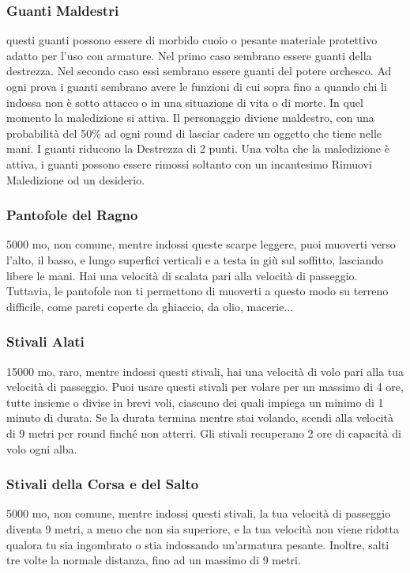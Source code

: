 \begin{multicols}{2}
\subsubsection*{Guanti Maldestri}
questi guanti possono essere di morbido cuoio o pesante materiale protettivo adatto per l’uso con armature. Nel primo caso sembrano essere guanti della destrezza. Nel secondo caso essi sembrano essere guanti del potere orchesco. Ad ogni prova i guanti sembrano avere le funzioni di cui sopra fino a quando chi li indossa non è sotto attacco o in una situazione di vita o di morte. In quel momento la maledizione si attiva. Il personaggio diviene maldestro, con una probabilità del 50\% ad ogni round di lasciar cadere un oggetto che tiene nelle mani. I guanti riducono la Destrezza di 2 punti. Una volta che la maledizione è attiva, i guanti possono essere rimossi soltanto con un incantesimo Rimuovi Maledizione od un desiderio.

\subsubsection*{Pantofole del Ragno}
5000 mo, non comune, mentre indossi queste scarpe leggere, puoi muoverti verso l'alto, il basso, e lungo superfici verticali e a testa in giù sul soffitto, lasciando libere le mani. Hai una velocità di scalata pari alla velocità di passeggio. Tuttavia, le pantofole non ti permettono di muoverti a questo modo su terreno difficile, come pareti coperte da ghiaccio, da olio, macerie...

\subsubsection*{Stivali Alati}
15000 mo, raro, mentre indossi questi stivali, hai una velocità di volo pari alla tua velocità di passeggio. Puoi usare questi stivali per volare per un massimo di 4 ore, tutte insieme o divise in brevi voli, ciascuno dei quali impiega un minimo di 1 minuto di durata. Se la durata termina mentre stai volando, scendi alla velocità di 9 metri per round finché non atterri. Gli stivali recuperano 2 ore di capacità di volo ogni alba.

\subsubsection*{Stivali della Corsa e del Salto}
5000 mo, non comune, mentre indossi questi stivali, la tua velocità di passeggio diventa 9 metri, a meno che non sia superiore, e la tua velocità non viene ridotta qualora tu sia ingombrato o stia indossando un'armatura pesante. Inoltre, salti tre volte la normale distanza, fino ad un massimo di 9 metri.


\end{multicols}
